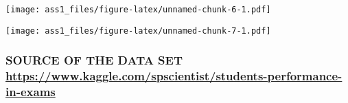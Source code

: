 \documentclass[
]{article}
\newenvironment{Shaded}{\begin{snugshade}}{\end{snugshade}}
\newcommand{\AttributeTok}[1]{\textcolor[rgb]{0.77,0.63,0.00}{#1}}
\newcommand{\DocumentationTok}[1]{\textcolor[rgb]{0.56,0.35,0.01}{\textbf{\textit{#1}}}}
\newcommand{\FunctionTok}[1]{\textcolor[rgb]{0.00,0.00,0.00}{#1}}
\newcommand{\NormalTok}[1]{#1}
\newcommand{\SpecialCharTok}[1]{\textcolor[rgb]{0.00,0.00,0.00}{#1}}
\newcommand{\StringTok}[1]{\textcolor[rgb]{0.31,0.60,0.02}{#1}}
\begin{document}
\begin{Shaded}
\end{Shaded}

\texttt{[image: ass1\_files/figure-latex/unnamed-chunk-6-1.pdf]}

\begin{Shaded}
\end{Shaded}

\texttt{[image: ass1\_files/figure-latex/unnamed-chunk-7-1.pdf]}

\hypertarget{source-of-the-data-set-httpswww.kaggle.comspscientiststudents-performance-in-exams}{%
\subsubsection{\texorpdfstring{SOURCE OF THE DATA SET
\url{https://www.kaggle.com/spscientist/students-performance-in-exams}}{SOURCE OF THE DATA SET https://www.kaggle.com/spscientist/students-performance-in-exams}}\label{source-of-the-data-set-httpswww.kaggle.comspscientiststudents-performance-in-exams}}
\end{document}
